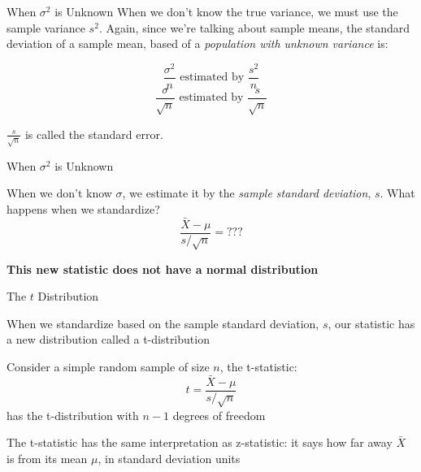 \documentclass{beamer}
\begin{document}
\begin{frame}{When $\sigma^2$ is Unknown}
	When we don't know the true variance, we must use the sample variance $s^2$. Again, since we're talking about sample means, the standard deviation of a sample mean, based of a \textit{population with unknown variance} is:

	\[
		\frac{\sigma^2}{n} \text{ estimated by } \frac{s^2}{n} 
	\]
	\[
		\frac{\sigma}{\sqrt{n}} \text{ estimated by } \frac{s}{\sqrt{n}} 
	\]

	$\frac{s}{\sqrt{n}}$ is called the \alert{standard error}.
	
\end{frame}

\begin{frame}{When $\sigma^2$ is Unknown}
	
	When we don't know $\sigma$, we estimate it by the \textit{sample standard deviation}, $s$. What happens when we standardize?
	$$\frac{\bar{X}-\mu}{s/\sqrt{n}}=???$$
	
	\textbf{This new statistic does not have a normal distribution}
	
\end{frame}

\begin{frame}{The $t$ Distribution}
	
	When we standardize based on the sample standard deviation, $s$, our statistic has a new distribution called a \alert{t-distribution}
	\begin{definition}
		\vspace{5mm}
		Consider a simple random sample of size $n$, the t-statistic:
		\[
			t = \frac{\bar{X}-\mu}{s/\sqrt{n}}
		\]
		has the t-distribution with $n-1$ degrees of freedom
	\end{definition}

	The t-statistic has the same interpretation as z-statistic: it says how far away $\bar{X}$ is from its mean $\mu$, in standard deviation units
	
\end{frame}
\end{document}
